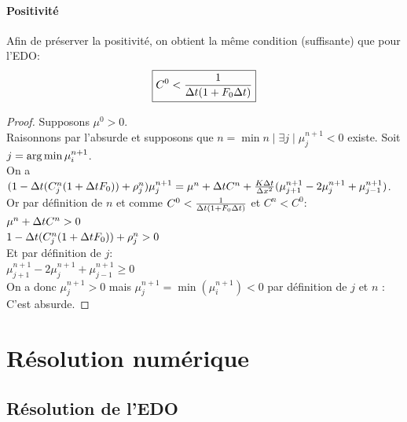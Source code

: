 \paragraph{Positivité}
Afin de préserver la positivité, on obtient la même condition (suffisante) que pour l'EDO:
\begin{equation}
	\boxed{C^0< \frac{1}{\Delta t(1+F_0\Delta t)}}
\end{equation}
\begin{proof} Supposons $\mu^0 >0$.\\ Raisonnons par l'absurde et supposons que $n=\min{n \mid \exists j \mid \mu^{n+1}_j < 0}$ existe. Soit $j = \operatorname*{arg\,min}{\mu^{n+1}_i}$.\\
On a $(1-\Delta t(C^{n}_j(1+\Delta t F_0)) + \rho^{n}_j)\mu^{n+1}_j = \mu^{n}+  \Delta t C^{n} +\frac{K\Delta t}{\Delta x^2}(\mu^{n+1}_{j+1} - 2\mu^{n+1}_j + \mu^{n+1}_{j-1}) $. \\
Or par définition de $n$ et comme $C^0< \frac{1}{\Delta t(1+F_0\Delta t)}$ et $C^n < C^0$:\\
 $ \mu^{n}+  \Delta t C^{n} > 0$ \\
 $ 1-\Delta t(C^{n}_j(1+\Delta t F_0)) + \rho^{n}_j > 0$ \\
Et par définition de $j$: \\
$\mu^{n+1}_{j+1} - 2\mu^{n+1}_j + \mu^{n+1}_{j-1} \geq 0$\\
On a donc $\mu^{n+1}_j > 0$ mais   $\mu^{n+1}_j = \min(\mu^{n+1}_i) < 0$ par définition de $j$ et $n$ : C'est absurde.
\end{proof}

\newpage
\section{Résolution numérique}
\subsection{Résolution de l'EDO}
